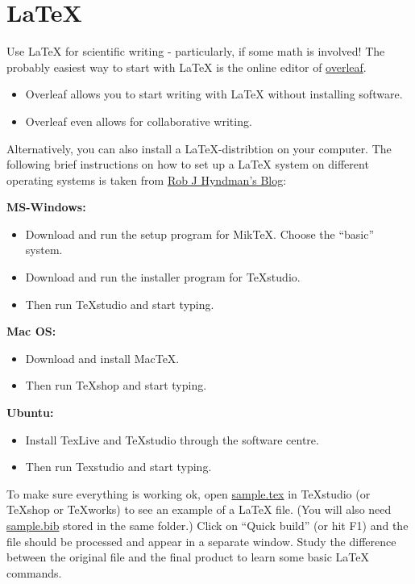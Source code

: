 \documentclass[]{book}
\providecommand{\tightlist}{%
  \setlength{\itemsep}{0pt}\setlength{\parskip}{0pt}}
\theoremstyle{definition}
\theoremstyle{definition}
\theoremstyle{definition}
\theoremstyle{remark}
\begin{document}
\hypertarget{latex}{%
\section{LaTeX}\label{latex}}

Use LaTeX for scientific writing - particularly, if some math is involved! The probably easiest way to start with LaTeX is the online editor of \href{https://overleaf.com/}{overleaf}.

\begin{itemize}
\tightlist
\item
  Overleaf allows you to start writing with LaTeX without installing software.
\item
  Overleaf even allows for collaborative writing.
\end{itemize}

Alternatively, you can also install a LaTeX-distribtion on your computer. The following brief instructions on how to set up a LaTeX system on different operating systems is taken from \href{https://robjhyndman.com/hyndsight/latex-setup/}{Rob J Hyndman's Blog}:

\textbf{MS-Windows:}

\begin{itemize}
\tightlist
\item
  Download and run the setup program for MikTeX. Choose the ``basic'' system.
\item
  Download and run the installer program for TeXstudio.
\item
  Then run TeXstudio and start typing.
\end{itemize}

\textbf{Mac OS:}

\begin{itemize}
\tightlist
\item
  Download and install MacTeX.
\item
  Then run TeXshop and start typing.
\end{itemize}

\textbf{Ubuntu:}

\begin{itemize}
\tightlist
\item
  Install TexLive and TeXstudio through the software centre.
\item
  Then run Texstudio and start typing.
\end{itemize}

To make sure everything is working ok, open \href{https://robjhyndman.com/research/sample.tex}{sample.tex} in TeXstudio (or TeXshop or TeXworks) to see an example of a LaTeX file. (You will also need \href{https://robjhyndman.com/research/sample.bib}{sample.bib} stored in the same folder.) Click on ``Quick build'' (or hit F1) and the file should be processed and appear in a separate window. Study the difference between the original file and the final product to learn some basic LaTeX commands.
\end{document}
